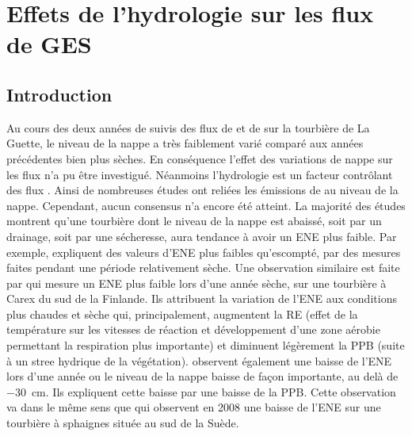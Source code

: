 \singlespacing
\chapter{Effets de l'hydrologie sur les flux de GES}
\label{ch:4}

\minitoc

\newpage
\doublespacing
\section{Introduction}

Au cours des deux années de suivis des flux de \coo et de \chh sur la tourbière de La Guette, le niveau de la nappe a très faiblement varié comparé aux années précédentes bien plus sèches.
En conséquence l'effet des variations de nappe sur les flux n'a pu être investigué.
Néanmoins l'hydrologie est un facteur contrôlant des flux \citep{blodau2002}.
Ainsi de nombreuses études ont reliées les émissions de \coo au niveau de la nappe.
Cependant, aucun consensus n'a encore été atteint.
La majorité des études montrent qu'une tourbière dont le niveau de la nappe est abaissé, soit par un drainage, soit par une sécheresse, aura tendance à avoir un ENE plus faible.
Par exemple, \citet{strack2013} expliquent des valeurs d'ENE plus faibles qu'escompté, par des mesures faites pendant une période relativement sèche.
Une observation similaire est faite par \citet{aurela2007} qui mesure un ENE plus faible lors d'une année sèche, sur une tourbière à Carex du sud de la Finlande.
Ils attribuent la variation de l'ENE aux conditions plus chaudes et sèche qui, principalement, augmentent la RE (effet de la température sur les vitesses de réaction et développement d'une zone aérobie permettant la respiration plus importante) et diminuent légèrement la PPB (suite à un stree hydrique de la végétation).
\citet{peichl2014} observent également une baisse de l'ENE lors d'une année ou le niveau de la nappe baisse de façon importante, au delà de \SI{-30}{\centi\metre}.
Ils expliquent cette baisse par une baisse de la PPB.
Cette observation va dans le même sens que \citet{lund2012} qui observent en 2008 une baisse de l'ENE sur une tourbière à sphaignes située au sud de la Suède.
